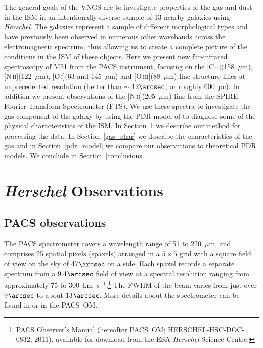 \documentclass[preprint2]{aastex}
\begin{document}
The general goals of the VNGS are to investigate properties of the gas and dust in the ISM in an intentionally diverse sample of 13 nearby galaxies using \emph{Herschel}.  The galaxies represent a sample of different morphological types and have previously been observed in numerous other wavebands across the electromagnetic spectrum, thus allowing us to create a complete picture of the conditions in the ISM of these objects.  Here we present new far-infrared spectroscopy of M51 from the PACS instrument, focusing on the [C\,\textsc{ii}](158~$\mu$m), [N\,\textsc{ii}](122~$\mu$m), [O\,\textsc{i}](63 and 145~$\mu$m) and [O\,\textsc{iii}](88~$\mu$m) fine structure lines at unprecedented resolution (better than $\sim 12\arcsec$, or roughly 600~pc).  In addition we present observations of the [N\,\textsc{ii}](205~$\mu$m) line from the SPIRE Fourier Transform Spectrometer (FTS).  We use these spectra to investigate the gas component of the galaxy by using the PDR model of \citet{1999ApJ...527..795K, 2006ApJ...644..283K} to diagnose some of the physical characteristics of the ISM.  In Section~\ref{Herschel_obs} we describe our method for processing the data.  In Section~\ref{gas_char} we describe the characteristics of the gas and in Section~\ref{pdr_model} we compare our observations to theoretical PDR models.  We conclude in Section~\ref{conclusions}.

\section{\emph{Herschel} Observations}\label{Herschel_obs}

\subsection{PACS observations}\label{pacs_obs}
The PACS spectrometer covers a wavelength range of 51 to 220~$\mu$m, and comprises 25 spatial pixels (spaxels) arranged in a $5 \times 5$ grid with a square field of view on the sky of 47$\arcsec$ on a side.  Each spaxel records a separate spectrum from a 9.4$\arcsec$ field of view at a spectral resolution ranging from approximately 75 to 300~km~$s^{-1}$.\footnote{PACS Observer's Manual (hereafter PACS~OM; HERSCHEL-HSC-DOC-0832, 2011), available for download from the ESA \emph{Herschel} Science Centre.}  The FWHM of the beam varies from just over 9$\arcsec$ to about 13$\arcsec$.  More details about the spectrometer can be found in \citet{2010A&A...518L...2P} or in the PACS~OM.
\end{document}
